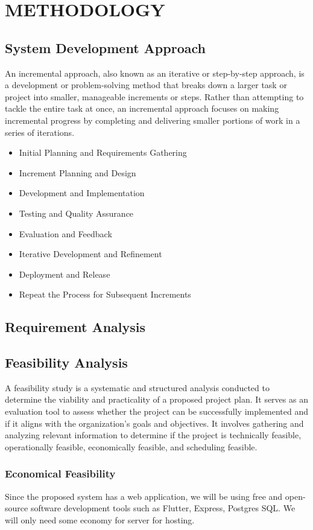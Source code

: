\chapter{METHODOLOGY}
\section{System Development Approach}
An incremental approach, also known as an iterative or step-by-step approach, is a development or problem-solving method that breaks down a larger task or project into smaller, manageable increments or steps. Rather than attempting to tackle the entire task at once, an incremental approach focuses on making incremental progress by completing and delivering smaller portions of work in a series of iterations.
\begin{itemize}
    \setlength\itemsep{0.25em}
    \item Initial Planning and Requirements Gathering
    \item Increment Planning and Design
    \item Development and Implementation
    \item Testing and Quality Assurance
    \item Evaluation and Feedback
    \item Iterative Development and Refinement
    \item Deployment and Release
    \item Repeat the Process for Subsequent Increments
\end{itemize}
\section{Requirement Analysis}
\section{Feasibility Analysis}
A feasibility study is a systematic and structured analysis conducted to determine the viability and practicality of a proposed project plan. It serves as an evaluation tool to assess whether the project can be successfully implemented and if it aligns with the organization's goals and objectives. It involves gathering and analyzing relevant information to determine if the project is technically feasible, operationally feasible, economically feasible, and scheduling feasible.
\subsection{Economical Feasibility}
Since the proposed system has a web application, we will be using free and open-source software development tools such as Flutter, Express, Postgres SQL. We will only need some economy for server for hosting.
